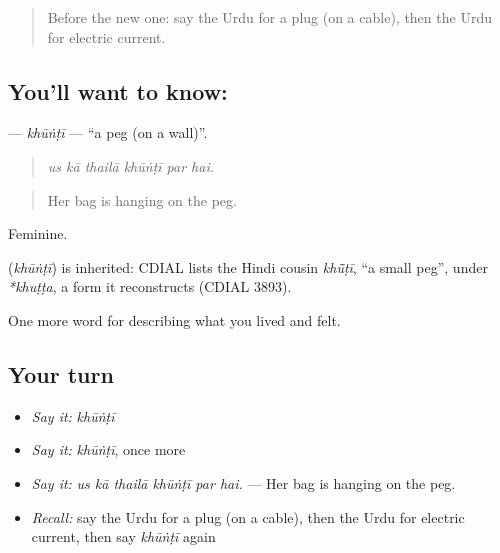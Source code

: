 \begin{quote}
Before the new one: say the Urdu for a plug (on a cable), then the Urdu for electric current.
\end{quote}

\subsection*{You'll want to know: }
\textbf{} — \emph{khūṅṭī} — \textquotedblleft{}a peg (on a wall)\textquotedblright{}.

\begin{quote}
     
\end{quote}

\begin{quote}
\emph{us kā thailā khūṅṭī par hai.}
\end{quote}

\begin{quote}
Her bag is hanging on the peg.
\end{quote}

Feminine.

\begin{cousinweb}
\textbf{} (\emph{khūṅṭī}) is inherited: CDIAL lists the Hindi cousin \emph{khū̃ṭī}, \textquotedblleft{}a small peg\textquotedblright{}, under \emph{*khuṭṭa}, a form it reconstructs (CDIAL 3893).
\end{cousinweb}

\begin{grammarlens}[title={What you've built}]
One more word for describing what you lived and felt.
\end{grammarlens}

\subsection*{Your turn}
\begin{itemize}
\raggedright
  \item \emph{Say it:} \emph{khūṅṭī}
  \item \emph{Say it:} \emph{khūṅṭī}, once more
  \item \emph{Say it:} \emph{us kā thailā khūṅṭī par hai.} — Her bag is hanging on the peg.
  \item \emph{Recall:} say the Urdu for a plug (on a cable), then the Urdu for electric current, then say \emph{khūṅṭī} again
\end{itemize}

